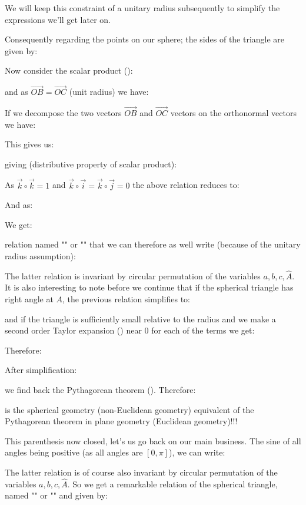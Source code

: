 	We will keep this constraint of a unitary radius subsequently to simplify the expressions we'll get later on.
	
	Consequently regarding the points on our sphere; the sides of the triangle are given by:
	
	Now consider the scalar product ():
	
	and as $\overrightarrow{OB}= \overrightarrow{OC}$ (unit radius) we have:
	
	If we decompose the two vectors $\overrightarrow{OB}$ and $\overrightarrow{OC}$ vectors on the orthonormal vectors we have:
	
	This gives us:
	
	giving (distributive property of scalar product):
	
	As $\vec{k}\circ \vec{k}=1$ and $\vec{k}\circ \vec{i}=\vec{k}\circ \vec{j}=0$ the above relation reduces to:
	
	And as:
	
	We get:
	
	relation named "" or "" that we can therefore as well write (because of the unitary radius assumption):
	
	The latter relation is invariant by circular permutation of the variables $a,b,c,\hat{A}$. It is also interesting to note before we continue that if the spherical triangle has right angle at $A$, the previous relation simplifies to:
	
	and if the triangle is sufficiently small relative to the radius and we make a second order Taylor expansion () near $0$  for each of the terms we get:
	
	Therefore:
	
	After simplification:
	
	we find back the Pythagorean theorem (). Therefore:
	
	is the spherical geometry (non-Euclidean geometry) equivalent  of the Pythagorean theorem in plane geometry (Euclidean geometry)!!!
	
	This  parenthesis now closed, let's us go back on our main business. The sine of all angles being positive (as all angles are $[0,\pi]$), we can write:
	
	The latter relation is of course also invariant by circular permutation of the variables $a,b,c,\hat{A}$. So we get a remarkable relation of the spherical triangle, named "" or "" and given by:
	
